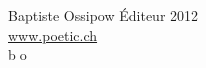 \documentclass[a4paper, titlepage, twoside, 12pt]{book}
\begin{document}
\newpage
\tableofcontents            %
\newpage
\pagestyle{empty}

\begin{center}
\baselineskip=20pt 

\vspace*{17.5cm}
Baptiste Ossipow \'Editeur 2012
\\
\vspace*{1.5cm}
\url{www.poetic.ch}
\\
\textcircled{bo}
\end{center}


\newpage

\layout
\end{document}
